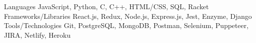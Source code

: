 
\begin{cvskills}
  \cvskill
    {Languages} %
    {JavaScript, Python, C, C++, HTML/CSS, SQL, Racket} %
  \cvskill
    {Frameworks/Libraries} %
    {React.js, Redux, Node.js, Express.js, Jest, Enzyme, Django} %
  \cvskill
    {Tools/Technologies} %
    {Git, PostgreSQL, MongoDB, Postman, Selenium, Puppeteer, JIRA, Netlify, Heroku} %
\end{cvskills}
